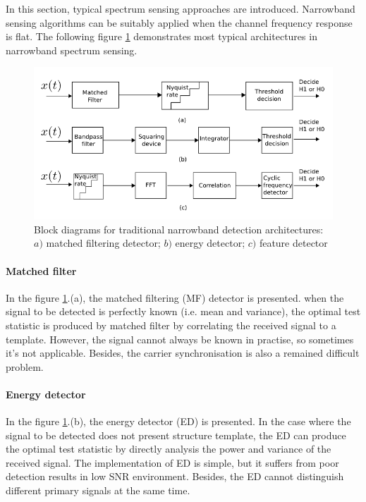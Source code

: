 \indent \indent In this section, typical spectrum sensing approaches are introduced. Narrowband sensing algorithms can be suitably applied when the channel frequency response is flat. The following figure \ref{narr_spec_sens} demonstrates most typical architectures in narrowband spectrum sensing.

\begin{figure}
\centering
\includegraphics[width=0.75\columnwidth]{figs/narr_spec_sens.png}
\caption{Block diagrams for traditional narrowband detection architectures: $a)$ matched filtering detector; $b)$ energy detector; $c)$ feature detector}
\label{narr_spec_sens}
\end{figure}

\paragraph{Matched filter}
In the figure \ref{narr_spec_sens}.(a), the matched filtering (MF) detector\cite{poor1994introduction} is presented. when the signal to be detected is perfectly known (i.e. mean and variance), the optimal test statistic is produced by matched filter by correlating the received signal to a template. However, the signal cannot always be known in practise, so sometimes it's not applicable. Besides, the carrier synchronisation is also a remained difficult problem.

\paragraph{Energy detector}
In the figure \ref{narr_spec_sens}.(b), the energy detector (ED) \cite{urkowitz1967energy} is presented. In the case where the signal to be detected does not present structure template, the ED can produce the optimal test statistic by directly analysis the power and variance of the received signal. The implementation of ED is simple, but it suffers from poor detection results in low SNR environment. Besides, the ED cannot distinguish different primary signals at the same time.

